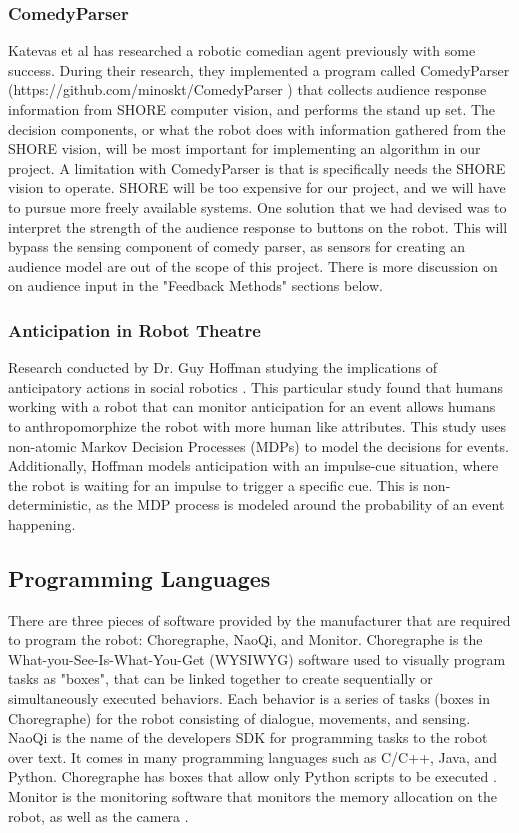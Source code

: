   \subsubsection{ComedyParser}
  Katevas et al \cite{KatevasRobot:2014} has researched a robotic comedian agent previously with some success. During their research, they implemented a program called ComedyParser (https://github.com/minoskt/ComedyParser ) that collects audience response information from SHORE computer vision, and performs the stand up set. The decision components, or what the robot does with information gathered from the SHORE vision, will be most important for implementing an algorithm in our project.
  A limitation with ComedyParser is that is specifically needs the SHORE vision to operate. SHORE will be too expensive for our project, and we will have to pursue more freely available systems. One solution that we had devised was to interpret the strength of the audience response to buttons on the robot. This will bypass the sensing component of comedy parser, as sensors for creating an audience model are out of the scope of this project. There is more discussion on on audience input in the "Feedback Methods" sections below.

  \subsubsection{Anticipation in Robot Theatre}
  Research conducted by Dr. Guy Hoffman studying the implications of anticipatory actions in social robotics \cite{hoffman2010anticipation}. This particular study found that humans working with a robot that can monitor anticipation for an event allows humans to anthropomorphize the robot with more human like attributes. This study uses non-atomic Markov Decision Processes (MDPs) to model the decisions for events. Additionally, Hoffman models anticipation with an impulse-cue situation, where the robot is waiting for an impulse to trigger a specific cue. This is non-deterministic, as the MDP process is modeled around the probability of an event happening.

\subsection{Programming Languages}

  There are three pieces of software provided by the manufacturer that are required to program the robot: Choregraphe, NaoQi, and Monitor. Choregraphe is the What-you-See-Is-What-You-Get (WYSIWYG) software used to visually program tasks as "boxes", that can be linked together to create sequentially or simultaneously executed behaviors. Each behavior is a series of tasks (boxes in Choregraphe) for the robot consisting of dialogue, movements, and sensing. NaoQi is the name of the developers SDK for programming tasks to the robot over text. It comes in many programming languages such as C/C++, Java, and Python. Choregraphe has boxes that allow only Python scripts to be executed \cite{programmingLanguages}. Monitor is the monitoring software that monitors the memory allocation on the robot, as well as the camera \cite{monitor}.

